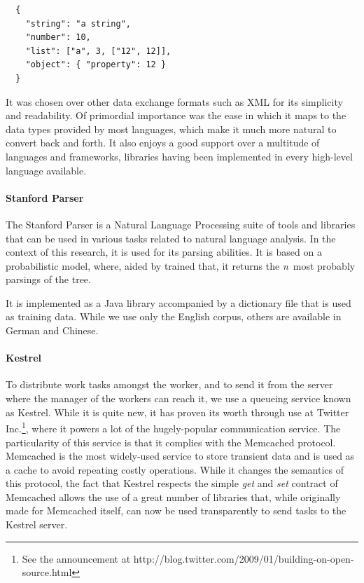 \begin{verbatim}
  {
    "string": "a string",
    "number": 10,
    "list": ["a", 3, ["12", 12]],
    "object": { "property": 12 }
  }
\end{verbatim}

It was chosen over other data exchange formats such as XML for its simplicity and readability. Of primordial importance was the ease in which it maps to the data types provided by most languages, which make it much more natural to convert back and forth. It also enjoys a good support over a multitude of languages and frameworks, libraries having been implemented in every high-level language available.


\paragraph{Stanford Parser} %
\label{par:stanford_parser}

The Stanford Parser is a Natural Language Processing suite of tools and libraries that can be used in various tasks related to natural language analysis. In the context of this research, it is used for its parsing abilities. It is based on a probabilistic model, where, aided by trained that, it returns the \emph{n}\ most probably parsings of the tree.

It is implemented as a Java library accompanied by a dictionary file that is used as training data. While we use only the English corpus, others are available in German and Chinese.


\paragraph{Kestrel} %
\label{par:kestrel}

To distribute work tasks amongst the worker, and to send it from the server where the manager of the workers can reach it, we use a queueing service known as Kestrel. While it is quite new, it has proven its worth through use at Twitter Inc.\footnote{See the announcement at http://blog.twitter.com/2009/01/building-on-open-source.html}, where it powers a lot of the hugely-popular communication service. The particularity of this service is that it complies with the Memcached protocol. Memcached is the most widely-used service to store transient data and is used as a cache to avoid repeating costly operations. While it changes the semantics of this protocol, the fact that Kestrel respects the simple \emph{get} and \emph{set} contract of Memcached allows the use of a great number of libraries that, while originally made for Memcached itself, can now be used transparently to send tasks to the Kestrel server.

